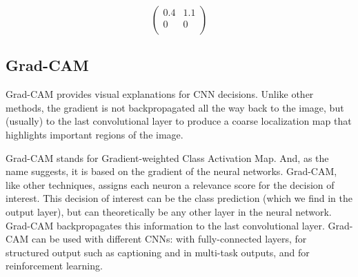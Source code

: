 \documentclass[
  12pt,
]{krantz}
\begin{document}
\[
\begin{pmatrix}
0.4 & 1.1 \\
0 & 0  \\
\end{pmatrix}
\]

\hypertarget{grad-cam}{%
\subsection{Grad-CAM}\label{grad-cam}}

Grad-CAM provides visual explanations for CNN decisions.
Unlike other methods, the gradient is not backpropagated all the way back to the image, but (usually) to the last convolutional layer to produce a coarse localization map that highlights important regions of the image.

Grad-CAM stands for Gradient-weighted Class Activation Map.
And, as the name suggests, it is based on the gradient of the neural networks.
Grad-CAM, like other techniques, assigns each neuron a relevance score for the decision of interest.
This decision of interest can be the class prediction (which we find in the output layer), but can theoretically be any other layer in the neural network.
Grad-CAM backpropagates this information to the last convolutional layer.
Grad-CAM can be used with different CNNs: with fully-connected layers, for structured output such as captioning and in multi-task outputs, and for reinforcement learning.
\end{document}
